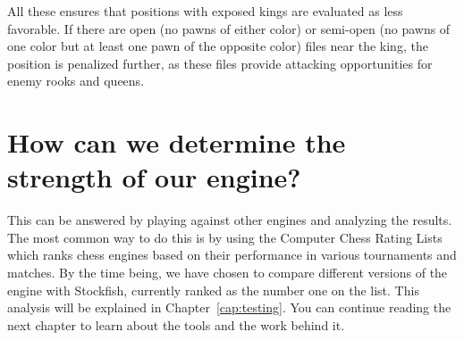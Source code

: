 \vspace{1em}

\noindent All these ensures that positions with exposed kings are evaluated as less favorable. If there are open (no pawns of either color) or semi-open (no pawns of one color but at least one pawn of the opposite color) files near the king, the position is penalized further, as these files provide attacking opportunities for enemy rooks and queens.

\vspace{1em}

\section{How can we determine the strength of our engine?}

This can be answered by playing against other engines and analyzing the results. The most common way to do this is by using the Computer Chess Rating Lists which ranks chess engines based on their performance in various tournaments and matches. By the time being, we have chosen to compare different versions of the engine with Stockfish, currently ranked as the number one on the list. This analysis will be explained in Chapter~\ref{cap:testing}. You can continue reading the next chapter to learn about the tools and the work behind it.
